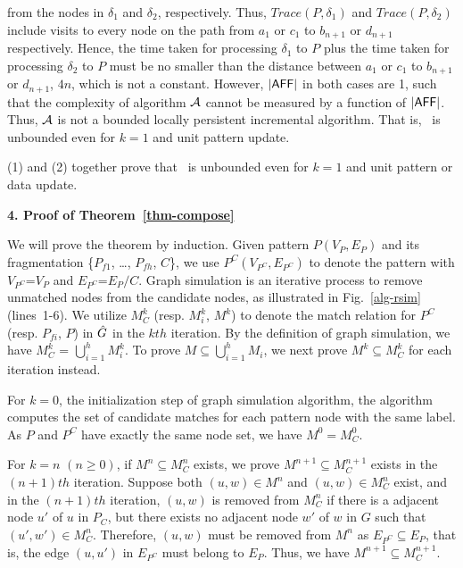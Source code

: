 from the nodes in $\delta_1$ and $\delta_2$, respectively.
Thus, $Trace(P, \delta_1)$ and $Trace(P, \delta_2)$ include visits to every node on the path from $a_1$ or $c_1$ to $b_{n+1}$ or $d_{n+1}$ respectively.
Hence, the time taken for processing $\delta_1$ to $P$ plus the time taken for processing $\delta_2$ to $P$ must be no smaller than the distance between $a_1$ or $c_1$ to $b_{n+1}$ or $d_{n+1}$, \ie $4n$, which is not a constant.
However, $|{\mathsf{AFF}}|$ in both cases are 1, such that the complexity of algorithm ${\cal A}$ cannot be measured by a function of $|{\mathsf{AFF}}|$.
Thus, ${\cal A}$ is not a bounded locally persistent incremental algorithm.
That is, \dynteamF\, is unbounded even for $k=1$ and unit pattern update.

\vspace{-1.0ex}
(1) and (2) together prove that \dynteamF\, is unbounded even for $k=1$ and unit pattern or data update.


\noindent
{\textbf{4. Proof of Theorem~\ref{thm-compose}}}

We will prove the theorem by induction.
Given pattern $P(V_P,E_P)$ and its fragmentation \{${P}_{f1}$, \ldots, ${P}_{fh}$, $C$\},
we use $P^{C}(V_{P^{C}},E_{P^{C}})$ to denote the pattern with $V_{P^{C}}$=$V_P$ and $E_{P^{C}}$=$E_P/C$.
Graph simulation is an iterative process to remove unmatched nodes from the candidate nodes,
as illustrated in Fig.~\ref{alg-rsim} (lines~1-6).
We utilize $M_{C}^{k}$ (resp. $M_{i}^{k}$, $M^{k}$) to denote the match relation for $P^{C}$ (resp. $P_{fi}$, $P$) in $\hat{G}{}$ in the $kth$ iteration.
By the definition of graph simulation, we have $M_{C}^{k}$ = $\bigcup_{i=1}^{h}M_{i}^{k}$.
To prove $M\subseteq\bigcup_{i=1}^{h}M_{i}$,
we next prove $M^{k}\subseteq M_{C}^{k}$ for each iteration instead.

\vspace{-1.8ex}
 For $k=0$, \ie the initialization step of graph simulation algorithm,
the algorithm computes the set of candidate matches for each pattern node with the same label.
As $P$ and $P^{C}$ have exactly the same node set, we have $M^{0}= M_{C}^{0}$.

\vspace{-1.8ex}
 For $k=n$ $(n\geq 0)$, if $M^{n}\subseteq M_{C}^{n}$ exists, we prove $M^{n+1}\subseteq M_{C}^{n+1}$ exists in the $(n+1)th$ iteration.
Suppose both $(u,w)\in M^{n}$ and $(u,w)\in M_{C}^{n}$ exist,
and in the $(n+1)th$ iteration, $(u,w)$ is removed from $M_{C}^{n}$ if there is a adjacent node $u'$ of $u$ in $P_{C}$,
but there exists no adjacent node $w'$ of $w$ in $G$ such that $(u',w')\in M_{C}^{n}$.
Therefore, $(u,w)$ must be removed from $M^{n}$ as $E_{P^{C}} \subseteq E_{P}$,
that is, the edge $(u,u')$ in $E_{P^{C}}$ must belong to $E_{P}$.
Thus, we have $M^{n+1}\subseteq M_{C}^{n+1}$.

